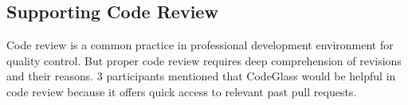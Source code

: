 





\subsection*{Supporting Code Review}

Code review is a common practice in professional development environment for quality control.
But proper code review requires deep comprehension of revisions and their reasons.
3 participants mentioned that CodeGlass would be helpful in code review because it offers quick access to relevant past pull requests.






